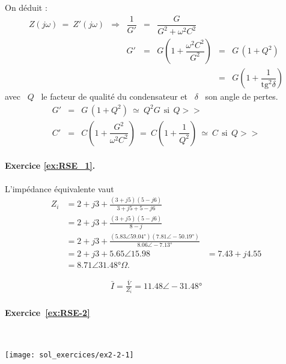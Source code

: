 On déduit :
\[ \begin{array}{rcrclcl}
Z(j\omega ) \: = \: Z'(j\omega ) 
& \Rightarrow & \dfrac{1}{G'} &=& \dfrac{G}{G^2 + \omega^2 C^2}\\
&& G'&=& G \left( 1 + \dfrac{\omega^2 C^2}{G^2} \right) &=& G \, (1 + Q^2)\\
&&&&&= & G \left( 1 + \dfrac{1}{\mbox{tg}^2 \delta} \right)
\end{array} \]
avec \ $Q$ \ le facteur de qualité du condensateur et \ $\delta$ \ son angle de pertes.
\begin{eqnarray*}
	G' &=& G\, (1+Q^2) \: \simeq \: Q^2 G ~~\mbox{si} ~~Q>>\\
	C' &=& C \left( 1 + \dfrac{G^2}{\omega^2 C^2} \right) \: = 
	\: C \left( 1 + \dfrac{1}{Q^2} \right) \: \simeq \: C ~~\mbox{si} ~~Q>>
\end{eqnarray*}

\paragraph{Exercice \ref{ex:RSE_1}.} L'impédance équivalente vaut 
\begin{align*}
Z_i &= 2+j3 + \frac{(3+j5)(5-j6)}{3+j5+5-j6} \\
&= 2+j3 + \frac{(3+j5)(5-j6)}{8-j} \\
&= 2+j3 + \frac{(5.83 \angle{59.04°} )(7.81 \angle -50.19°)}{8.06 \angle -7.13°} \\
&= 2+j3 + 5.65 \angle 15.98
&= 7.43 + j4.55 \\ &= 8.71 \angle 31.48° \Omega.
\end{align*}

\begin{align*}
\bar{I} = \frac{\bar{V}}{Z_i} = 11.48 \angle-31.48°
\end{align*}


\paragraph{Exercice~\ref{ex:RSE-2}}~\\%

\begin{center}
	\texttt{[image: sol\_exercices/ex2-2-1]}
\end{center}


